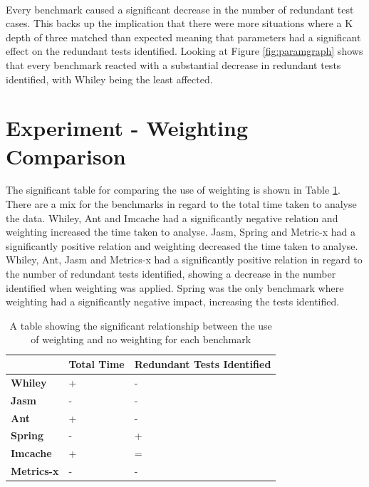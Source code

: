 \paragraph{}
Every benchmark caused a significant decrease in the number of redundant test cases. This backs up the implication that there were more situations where a K depth of three matched than expected meaning that parameters had a significant effect on the redundant tests identified. Looking at Figure \ref{fig:paramgraph} shows that every benchmark reacted with a substantial decrease in redundant tests identified, with Whiley being the least affected. 



\section{Experiment  - Weighting Comparison}
\label{sec:weight}
The significant table for comparing the use of weighting is shown in Table \ref{weightingsig}. There are a mix for the benchmarks in regard to the total time taken to analyse the data. Whiley, Ant and Imcache had a significantly negative relation and weighting increased the time taken to analyse. Jasm, Spring and Metric-x had a significantly positive relation and weighting decreased the time taken to analyse. Whiley, Ant, Jasm and Metrics-x had a significantly positive relation in regard to the number of redundant tests identified, showing a decrease in the number identified when weighting was applied. Spring was the only benchmark where weighting had a significantly negative impact, increasing the tests identified.

\begin{table}[h]
\centering


\begin{tabular}{|l|l|l|}
\hline
{\bf }          & {\bf Total Time} & {\bf Redundant Tests Identified} \\ \hline
{\bf Whiley}    & +                & -                           \\ \hline
{\bf Jasm}      & -                & -                           \\ \hline
{\bf Ant}       & +                & -                           \\ \hline
{\bf Spring}    & -                & +                           \\ \hline
{\bf Imcache}   & +                & =                           \\ \hline
{\bf Metrics-x} & -                & -                           \\ \hline
\end{tabular}
\caption{A table showing the significant relationship between the use of weighting and no weighting for each benchmark}
\label{weightingsig}
\end{table}


